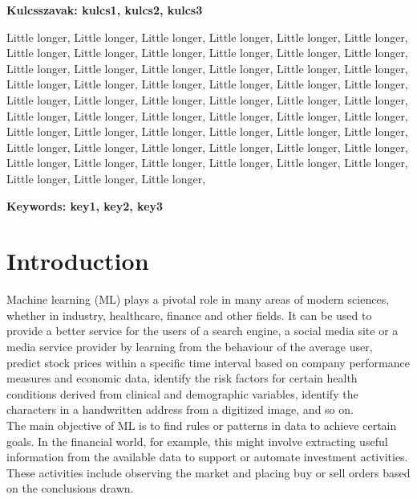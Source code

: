 \documentclass[a4paper,oneside,onecolumn,12pt]{LegrandOrangeBook}
\newcommand{\comment}[1]{{\textcolor{red}{#1}}}
\newcommand{\commentaron}[1]{{\textcolor{blue}{#1}}}
\begin{document}
\textbf{Kulcsszavak: kulcs1, kulcs2, kulcs3}

\pagebreak

Little longer, Little longer, Little longer, Little longer, Little longer, Little longer, Little longer, Little longer, Little longer, Little longer, Little longer, Little longer, Little longer, Little longer, Little longer, Little longer, Little longer, Little longer, Little longer, Little longer, Little longer, Little longer, Little longer, Little longer, Little longer, Little longer, Little longer, Little longer, Little longer, Little longer, Little longer, Little longer, Little longer, Little longer, Little longer, Little longer, Little longer, Little longer, Little longer, Little longer, Little longer, Little longer, Little longer, Little longer, Little longer, Little longer, Little longer, Little longer, Little longer, Little longer, Little longer, Little longer, Little longer, Little longer, Little longer, Little longer, Little longer, 

\textbf{Keywords: key1, key2, key3}

\pagebreak

\chapter*{Introduction}


Machine learning (ML) plays a pivotal role in many areas of modern sciences, whether in industry, healthcare, finance and other fields. It can be used to provide a better service for the users of a search engine, a social media site or a media service provider by learning from the behaviour of the average user, predict stock prices within a specific time interval based on company performance measures and economic data, identify the risk factors for certain health conditions derived from clinical and demographic variables, identify the characters in a handwritten address from a digitized image, and so on. \cite{TESL}\\
The main objective of ML is to find rules or patterns in data to achieve certain goals. In the financial world, for example, this might involve extracting useful information from the available data to support or automate investment activities. These activities include observing the market and placing buy or sell orders based on the conclusions drawn. \cite{MLAT}
\end{document}
